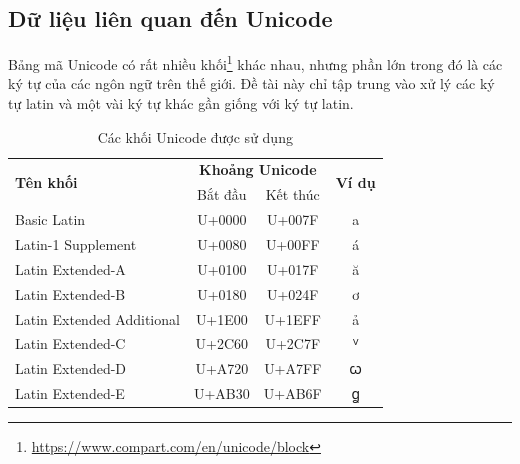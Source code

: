 \subsection*{Dữ liệu liên quan đến Unicode}
Bảng mã Unicode có rất nhiều khối\footnote{\url{https://www.compart.com/en/unicode/block}} khác nhau, nhưng phần lớn trong đó là các ký tự của các ngôn ngữ trên thế giới. Đề tài này chỉ tập trung vào xử lý các ký tự latin và một vài ký tự khác gần giống với ký tự latin.
\begin{table}[htb]
    \centering
    \caption{Các khối Unicode được sử dụng}
    \label{table:unicode-blocks}
    \begin{threeparttable}
        \begin{tabular}{lccc}
            \toprule
            \multirow{2}{*}{\textbf{Tên khối}}      & \multicolumn{2}{c}{\textbf{Khoảng Unicode}} & \multirow{2}{*}{ \textbf{Ví dụ}}     \\\cmidrule(lr){2-3}
                                                    & Bắt đầu                                     & Kết thúc                         &   \\\midrule
            Basic Latin                             & U+0000                                      & U+007F                           & a \\
            Latin-1 Supplement                      & U+0080                                      & U+00FF                           & á \\
            Latin Extended-A                        & U+0100                                      & U+017F                           & ă \\
            Latin Extended-B                        & U+0180                                      & U+024F                           & ơ \\
            Latin Extended Additional               & U+1E00                                      & U+1EFF                           & ả \\
            Latin Extended-C                        & U+2C60                                      & U+2C7F                           & ⱽ \\
            Latin Extended-D                        & U+A720                                      & U+A7FF                           & ꞷ \\
            Latin Extended-E                        & U+AB30                                      & U+AB6F                           & ꬶ \\

\end{tabular}
\end{threeparttable}
\end{table}
